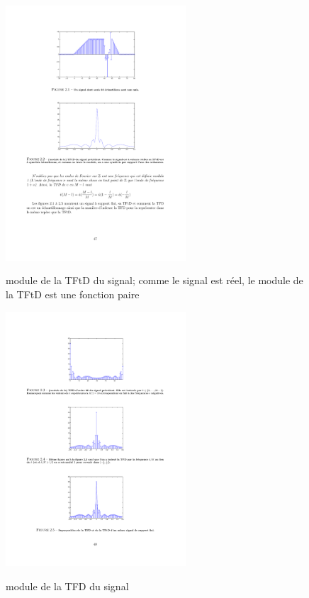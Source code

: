 \begin{figure}
  \centering
  \includegraphics[width=0.6\textwidth]{Figures/Figure2-2}\\
  \caption{module de la TFtD du signal; comme le signal est r\'eel, le module de la TFtD est une fonction paire}\label{fig:figure2-2}
\end{figure}

\begin{figure}
  \centering
  \includegraphics[width=0.6\textwidth]{Figures/Figure2-3}\\
  \caption{module de la TFD du signal}\label{fig:figure2-3}
\end{figure}

